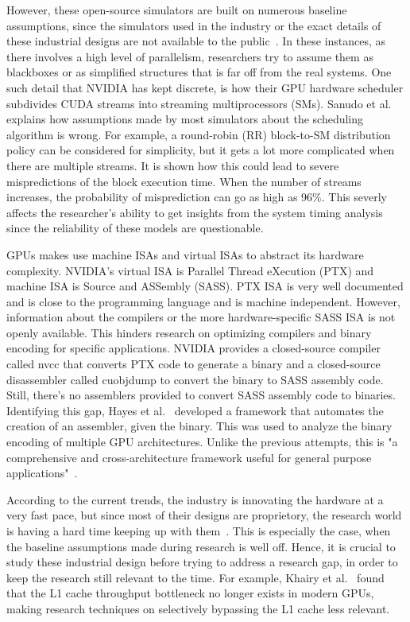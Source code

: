 However, these open-source simulators are built on numerous baseline assumptions, since the simulators used in the industry or the exact details of these industrial designs are not available to the public~\cite{Khairy2020}.
In these instances, as there involves a high level of parallelism, researchers try to assume them as blackboxes or as simplified structures that is far off from the real systems.
One such detail that NVIDIA has kept discrete, is how their GPU hardware scheduler subdivides CUDA streams into streaming multiprocessors (SMs). 
Sanudo et al.~\cite{Sanudo2020} explains how assumptions made by most simulators about the scheduling algorithm is wrong.
For example, a round-robin (RR) block-to-SM distribution policy can be considered for simplicity, but it gets a lot more complicated when there are multiple streams.
It is shown how this could lead to severe mispredictions of the block execution time.
When the number of streams increases, the probability of misprediction can go as high as 96\%.
This severly affects the researcher's ability to get insights from the system timing analysis since the reliability of these models are questionable.

GPUs makes use machine ISAs and virtual ISAs to abstract its hardware complexity.
NVIDIA's virtual ISA is Parallel Thread eXecution (PTX) and machine ISA is Source and ASSembly (SASS).
PTX ISA is very well documented and is close to the programming language and is machine independent.
However, information about the compilers or the more hardware-specific SASS ISA is not openly available.
This hinders research on optimizing compilers and binary encoding for specific applications.
NVIDIA provides a closed-source compiler called nvcc that converts PTX code to generate a binary and a closed-source disassembler called cuobjdump to convert the binary to SASS assembly code.
Still, there's no assemblers provided to convert SASS assembly code to binaries.
Identifying this gap, Hayes et al.~\cite{Hayes2019} developed a framework that automates the creation of an assembler, given the binary.
This was used to analyze the binary encoding of multiple GPU architectures.
Unlike the previous attempts, this is "a comprehensive and cross-architecture framework useful for general purpose applications"~\cite{Hayes2019}.

According to the current trends, the industry is innovating the hardware at a very fast pace, but since most of their designs are proprietory, the research world is having a hard time keeping up with them~\cite{Khairy2020}.
This is especially the case, when the baseline assumptions made during research is well off.
Hence, it is crucial to study these industrial design before trying to address a research gap, in order to keep the research still relevant to the time.
For example, Khairy et al.~\cite{Khairy2020} found that the L1 cache throughput bottleneck no longer exists in modern GPUs, making research techniques on selectively bypassing the L1 cache less relevant.


